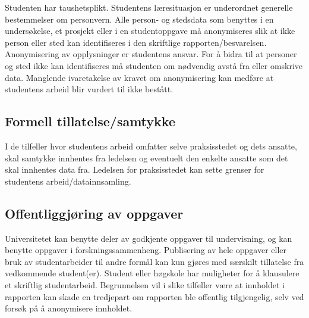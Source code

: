 \documentclass{USN-BSc}
\begin{document}
Studenten har taushetsplikt. Studentens læresituasjon er underordnet generelle
bestemmelser om personvern. Alle person- og stedsdata som benyttes i en
undersøkelse, et prosjekt eller i en studentoppgave må anonymiseres slik at
ikke person eller sted kan identifiseres i den skriftlige
rapporten/besvarelsen. Anonymisering av opplysninger er studentens ansvar. For
å bidra til at personer og sted ikke kan identifiseres må studenten om
nødvendig avstå fra eller omskrive data. Manglende ivaretakelse av kravet om
anonymisering kan medføre at studentens arbeid blir vurdert til ikke bestått.

\subsection{Formell tillatelse/samtykke}

I de tilfeller hvor studentens arbeid omfatter selve praksisstedet og dets
ansatte, skal samtykke innhentes fra ledelsen og eventuelt den enkelte ansatte
som det skal innhentes data fra. Ledelsen for praksisstedet kan sette grenser
for studentens arbeid/datainnsamling.

\subsection{Offentliggjøring av oppgaver}

Universitetet kan benytte deler av godkjente oppgaver til undervisning, og kan
benytte oppgaver i forskningssammenheng. Publisering av hele oppgaver eller
bruk av studentarbeider til andre formål kan kun gjøres med særskilt tillatelse
fra vedkommende student(er). Student eller høgskole har muligheter for å
klausulere et skriftlig studentarbeid. Begrunnelsen vil i slike tilfeller være
at innholdet i rapporten kan skade en tredjepart om rapporten ble offentlig
tilgjengelig, selv ved forsøk på å anonymisere innholdet.


\nocite{*}
\printbibliography[heading=none]
\end{document}
